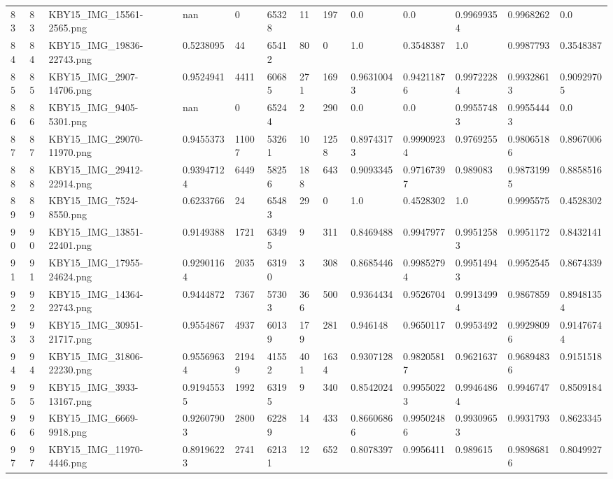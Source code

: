 \documentclass[11pt, a4paper, twoside]{report}
\begin{document}
\begin{longtable}[c]{@{}lllllllllllll@{}}
83 & 83 & KBY15\_IMG\_15561-2565.png & nan & 0 & 65328 & 11 & 197 & 0.0 & 0.0 & 0.99699354 & 0.9968262 & 0.0 \\
84 & 84 & KBY15\_IMG\_19836-22743.png & 0.5238095 & 44 & 65412 & 80 & 0 & 1.0 & 0.3548387 & 1.0 & 0.9987793 & 0.3548387 \\
85 & 85 & KBY15\_IMG\_2907-14706.png & 0.9524941 & 4411 & 60685 & 271 & 169 & 0.96310043 & 0.94211876 & 0.99722284 & 0.99328613 & 0.90929705 \\
86 & 86 & KBY15\_IMG\_9405-5301.png & nan & 0 & 65244 & 2 & 290 & 0.0 & 0.0 & 0.99557483 & 0.99554443 & 0.0 \\
87 & 87 & KBY15\_IMG\_29070-11970.png & 0.9455373 & 11007 & 53261 & 10 & 1258 & 0.89743173 & 0.99909234 & 0.9769255 & 0.98065186 & 0.8967006 \\
88 & 88 & KBY15\_IMG\_29412-22914.png & 0.93947124 & 6449 & 58256 & 188 & 643 & 0.9093345 & 0.97167397 & 0.989083 & 0.98731995 & 0.8858516 \\
89 & 89 & KBY15\_IMG\_7524-8550.png & 0.6233766 & 24 & 65483 & 29 & 0 & 1.0 & 0.4528302 & 1.0 & 0.9995575 & 0.4528302 \\
90 & 90 & KBY15\_IMG\_13851-22401.png & 0.9149388 & 1721 & 63495 & 9 & 311 & 0.8469488 & 0.9947977 & 0.99512583 & 0.9951172 & 0.8432141 \\
91 & 91 & KBY15\_IMG\_17955-24624.png & 0.92901164 & 2035 & 63190 & 3 & 308 & 0.8685446 & 0.99852794 & 0.99514943 & 0.9952545 & 0.8674339 \\
92 & 92 & KBY15\_IMG\_14364-22743.png & 0.9444872 & 7367 & 57303 & 366 & 500 & 0.9364434 & 0.9526704 & 0.99134994 & 0.9867859 & 0.89481354 \\
93 & 93 & KBY15\_IMG\_30951-21717.png & 0.9554867 & 4937 & 60139 & 179 & 281 & 0.946148 & 0.9650117 & 0.9953492 & 0.99298096 & 0.91476744 \\
94 & 94 & KBY15\_IMG\_31806-22230.png & 0.95569634 & 21949 & 41552 & 401 & 1634 & 0.9307128 & 0.98205817 & 0.9621637 & 0.96894836 & 0.9151518 \\
95 & 95 & KBY15\_IMG\_3933-13167.png & 0.91945535 & 1992 & 63195 & 9 & 340 & 0.8542024 & 0.99550223 & 0.99464864 & 0.9946747 & 0.8509184 \\
96 & 96 & KBY15\_IMG\_6669-9918.png & 0.92607903 & 2800 & 62289 & 14 & 433 & 0.86606866 & 0.99502486 & 0.99309653 & 0.9931793 & 0.8623345 \\
97 & 97 & KBY15\_IMG\_11970-4446.png & 0.89196223 & 2741 & 62131 & 12 & 652 & 0.8078397 & 0.9956411 & 0.989615 & 0.98986816 & 0.8049927 \\

\end{longtable}
\end{document}
